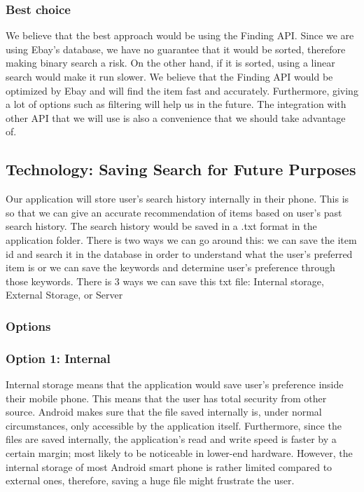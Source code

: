 \documentclass[journal,compsoc, 10pt, draftclsnofoot, onecolumn]{IEEEtran}
\begin{document}
\subsubsection{Best choice}
  We believe that the best approach would be using the Finding API. Since we are using Ebay's database, we have no guarantee that it would be sorted, therefore making binary search a risk. On the other hand, if it is sorted, using a linear search would make it run slower. We believe that the Finding API would be optimized by Ebay and will find the item fast and accurately. Furthermore, giving a lot of options such as filtering will help us in the future. The integration with other API that we will use is also a convenience that we should take advantage of. 
  
\subsection{Technology: Saving Search for Future Purposes}
Our application will store user's search history internally in their phone. This is so that we can give an accurate recommendation of items based on user's past search history. The search history would be saved in a .txt format in the application folder. There is two ways we can go around this: we can save the item id and search it in the database in order to understand what the user's preferred item is or we can save the keywords and determine user's preference through those keywords. 
There is 3 ways we can save this txt file: Internal storage, External Storage, or Server

\subsubsection{Options}
\subsubsection*{Option 1: Internal}
Internal storage means that the application would save user's preference inside their mobile phone. This means that the user has total security from other source. Android makes sure that the file saved internally is, under normal circumstances, only accessible by the application itself. Furthermore, since the files are saved internally, the application's read and write speed is faster by a certain margin; most likely to be noticeable in lower-end hardware. However, the internal storage of most Android smart phone is rather limited compared to external ones, therefore, saving a huge file might frustrate the user.
\end{document}
